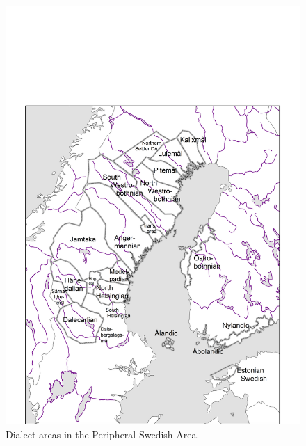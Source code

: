 \begin{figure}[h]
\includegraphics[height=.5\textheight]{figures/6_DialectAreas}
\caption{Dialect areas in the Peripheral Swedish Area.}
\label{map:5}
\end{figure}
 

